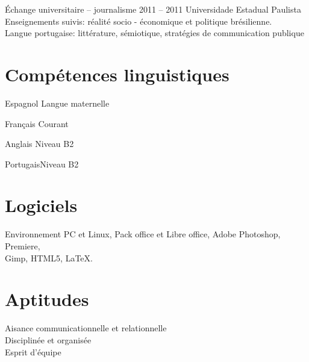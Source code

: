 \documentclass[30pt, french]{tccv}
\begin{document}
\begin{upshape}
\begin{textblock}{7}
\begin{mdframed}
\begin{yearlist}
     
\item[Échange universitaire -- journalisme]{2011 -- 2011}
     {Universidade Estadual Pau\-li\-sta }
     {Enseignements suivis: réalité socio - économique et politique brésilienne. \\
     Langue portugaise: littérature, sémiotique, stratégies de communication publique}


\end{yearlist}
\end{mdframed}

\vspace{1cm}

\begin{mdframed}
\section{Compétences linguistiques}

\begin{factlist}
\item{Espagnol} {Langue maternelle}	
\item{Français} {Courant}	
\item{Anglais}  {Niveau B2}	
\item{Portugais}{Niveau B2}
\end{factlist}

\section{Logiciels}
Environnement PC et Linux,
Pack office et Libre office,
Adobe Photoshop, Premiere, \\
Gimp,
HTML5,
\LaTeX.


\section{Aptitudes}

  \checkmark Aisance communicationnelle et relationnelle \\
  \checkmark Disciplinée et organisée \\
  \checkmark Esprit d'équipe \\  




\end{mdframed}
\end{textblock}



\end{upshape}
\end{document}

